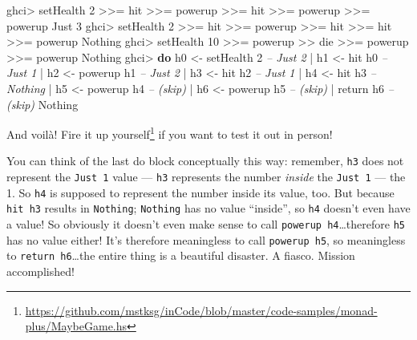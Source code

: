 \documentclass[]{article}
\newenvironment{Shaded}{}{}
\newcommand{\KeywordTok}[1]{\textcolor[rgb]{0.00,0.44,0.13}{\textbf{#1}}}
\newcommand{\DataTypeTok}[1]{\textcolor[rgb]{0.56,0.13,0.00}{#1}}
\newcommand{\DecValTok}[1]{\textcolor[rgb]{0.25,0.63,0.44}{#1}}
\newcommand{\CommentTok}[1]{\textcolor[rgb]{0.38,0.63,0.69}{\textit{#1}}}
\newcommand{\OtherTok}[1]{\textcolor[rgb]{0.00,0.44,0.13}{#1}}
\newcommand{\FunctionTok}[1]{\textcolor[rgb]{0.02,0.16,0.49}{#1}}
\newcommand{\NormalTok}[1]{#1}
\renewcommand{\href}[2]{#2\footnote{\url{#1}}}
\begin{document}
\begin{Shaded}
\begin{Highlighting}[]
\NormalTok{ghci}\FunctionTok{>}\NormalTok{ setHealth }\DecValTok{2} \FunctionTok{>>=}\NormalTok{ hit }\FunctionTok{>>=}\NormalTok{ powerup }\FunctionTok{>>=}\NormalTok{ hit }\FunctionTok{>>=}\NormalTok{ powerup }\FunctionTok{>>=}\NormalTok{ powerup}
\DataTypeTok{Just} \DecValTok{3}
\NormalTok{ghci}\FunctionTok{>}\NormalTok{ setHealth }\DecValTok{2} \FunctionTok{>>=}\NormalTok{ hit }\FunctionTok{>>=}\NormalTok{ powerup }\FunctionTok{>>=}\NormalTok{ hit }\FunctionTok{>>=}\NormalTok{ hit }\FunctionTok{>>=}\NormalTok{ powerup}
\DataTypeTok{Nothing}
\NormalTok{ghci}\FunctionTok{>}\NormalTok{ setHealth }\DecValTok{10} \FunctionTok{>>=}\NormalTok{ powerup }\FunctionTok{>>}\NormalTok{ die }\FunctionTok{>>=}\NormalTok{ powerup }\FunctionTok{>>=}\NormalTok{ powerup}
\DataTypeTok{Nothing}
\NormalTok{ghci}\FunctionTok{>} \KeywordTok{do}\NormalTok{  h0 }\OtherTok{<-}\NormalTok{ setHealth }\DecValTok{2}        \CommentTok{-- Just 2}
    \FunctionTok{|}\NormalTok{     h1 }\OtherTok{<-}\NormalTok{ hit h0             }\CommentTok{-- Just 1}
    \FunctionTok{|}\NormalTok{     h2 }\OtherTok{<-}\NormalTok{ powerup h1         }\CommentTok{-- Just 2}
    \FunctionTok{|}\NormalTok{     h3 }\OtherTok{<-}\NormalTok{ hit h2             }\CommentTok{-- Just 1}
    \FunctionTok{|}\NormalTok{     h4 }\OtherTok{<-}\NormalTok{ hit h3             }\CommentTok{-- Nothing}
    \FunctionTok{|}\NormalTok{     h5 }\OtherTok{<-}\NormalTok{ powerup h4         }\CommentTok{-- (skip)}
    \FunctionTok{|}\NormalTok{     h6 }\OtherTok{<-}\NormalTok{ powerup h5         }\CommentTok{-- (skip)}
    \FunctionTok{|}\NormalTok{     return h6                }\CommentTok{-- (skip)}
\DataTypeTok{Nothing}
\end{Highlighting}
\end{Shaded}

And voilà!
\href{https://github.com/mstksg/inCode/blob/master/code-samples/monad-plus/MaybeGame.hs}{Fire
it up yourself} if you want to test it out in person!

You can think of the last do block conceptually this way: remember, \texttt{h3}
does not represent the \texttt{Just\ 1} value --- \texttt{h3} represents the
number \emph{inside} the \texttt{Just\ 1} --- the 1. So \texttt{h4} is supposed
to represent the number inside its value, too. But because \texttt{hit\ h3}
results in \texttt{Nothing}; \texttt{Nothing} has no value ``inside'', so
\texttt{h4} doesn't even have a value! So obviously it doesn't even make sense
to call \texttt{powerup\ h4}\ldots{}therefore \texttt{h5} has no value either!
It's therefore meaningless to call \texttt{powerup\ h5}, so meaningless to
\texttt{return\ h6}\ldots{}the entire thing is a beautiful disaster. A fiasco.
Mission accomplished!
\end{document}
